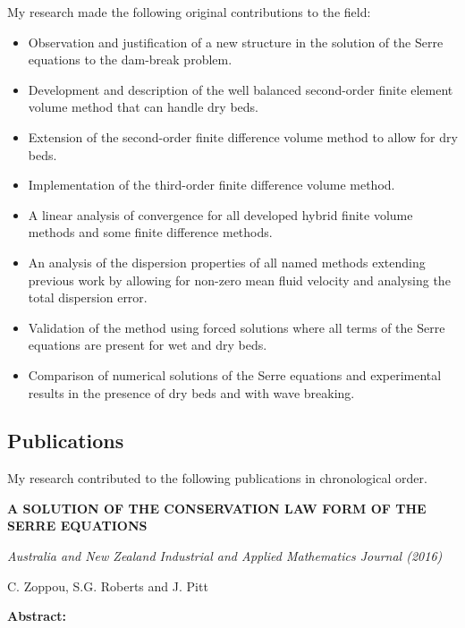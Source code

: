 My research made the following original contributions to the field:
\begin{itemize}
	\item Observation and justification of a new structure in the solution of the Serre equations to the dam-break problem.
	\item Development and description of the well balanced second-order finite element volume method that can handle dry beds.
	\item Extension of the second-order finite difference volume method to allow for dry beds.
	\item Implementation of the third-order finite difference volume method.
	\item A linear analysis of convergence for all developed hybrid finite volume methods and some finite difference methods.
	\item An analysis of the dispersion properties of all named methods extending previous work by allowing for non-zero mean fluid velocity and analysing the total dispersion error.
	\item Validation of the method using forced solutions where all terms of the Serre equations are present for wet and dry beds.
	\item Comparison of numerical solutions of the Serre equations and experimental results in the presence of dry beds and with wave breaking. 
\end{itemize}

\subsection{Publications}
My research contributed to the following publications in chronological order.

\begin{center}
	\textbf{
		\Large A SOLUTION OF THE CONSERVATION LAW FORM OF THE SERRE EQUATIONS}
	
	\vspace*{\baselineskip}
	
	\textit{Australia and New Zealand Industrial and Applied Mathematics Journal (2016)}
	
	{C. Zoppou, S.G. Roberts and J. Pitt}
	\vspace*{0.5\baselineskip}
\end{center}
\textbf{Abstract:}

